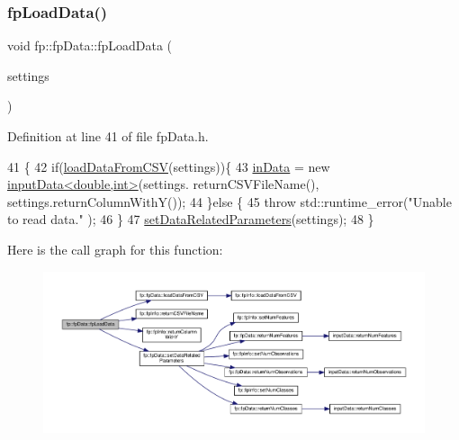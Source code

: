 \subsubsection{\texorpdfstring{fp\+Load\+Data()}{fpLoadData()}}
{\footnotesize\ttfamily void fp\+::fp\+Data\+::fp\+Load\+Data (\begin{DoxyParamCaption}\item[{\hyperlink{classfp_1_1fpInfo}{fp\+Info} \&}]{settings }\end{DoxyParamCaption})\hspace{0.3cm}{\ttfamily [inline]}}



Definition at line 41 of file fp\+Data.\+h.


\begin{DoxyCode}
41                                              \{
42                 \textcolor{keywordflow}{if}(\hyperlink{classfp_1_1fpData_a2b4d9be328aaa7acf9a2561150da0402}{loadDataFromCSV}(settings))\{
43                     \hyperlink{classfp_1_1fpData_a49d7c3f58bcf88843c25b1b0c9714ebe}{inData} = \textcolor{keyword}{new} \hyperlink{classinputData}{inputData<double,int>}(settings.
      returnCSVFileName(), settings.returnColumnWithY());
44                 \}\textcolor{keywordflow}{else} \{
45                     \textcolor{keywordflow}{throw} std::runtime\_error(\textcolor{stringliteral}{"Unable to read data."} );
46                 \}
47                 \hyperlink{classfp_1_1fpData_ab48923d57206e17b88f0d89833051b43}{setDataRelatedParameters}(settings);
48             \}
\end{DoxyCode}
Here is the call graph for this function\+:\nopagebreak
\begin{figure}[H]
\begin{center}
\leavevmode
\includegraphics[width=350pt]{classfp_1_1fpData_a91c727b1475eca340ca14c241b25c959_cgraph}
\end{center}
\end{figure}
\mbox{\label{classfp_1_1fpData_a4b527bc84762c4708992b7fdce3d0602}} 
